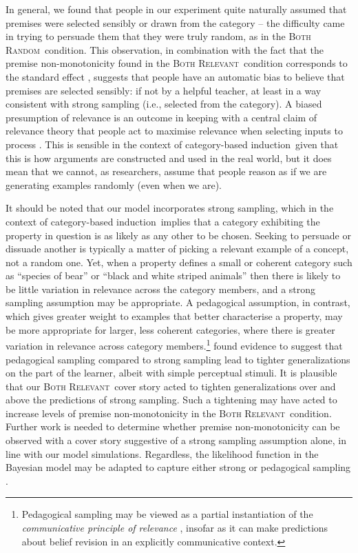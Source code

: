 \documentclass[doc,12pt]{apa}
\newcommand{\cbi}{category-based induction}
\newcommand{\relevant}{\textsc{Both Relevant}}
\newcommand{\random}{\textsc{Both Random}}
\begin{document}
%
In general, we found that people in our experiment quite naturally assumed that premises were selected sensibly or drawn from the category -- the difficulty came in trying to persuade them that they were truly random, as in the \random\ condition. This observation, in combination with the fact that the premise non-monotonicity found in the \relevant\ condition corresponds to the standard effect \cite{MCSH03}, suggests that people have an automatic bias to believe that premises are selected sensibly: if not by a helpful teacher, at least in a way consistent with strong sampling (i.e., selected from the category).
%
A biased presumption of relevance is an outcome in keeping with a central claim of relevance theory that people act to maximise relevance when selecting inputs to process \cite{WS04}. This is sensible in the context of \cbi\ given that this is how arguments are constructed and used in the real world, but it does mean that we cannot, as researchers, assume that people reason as if we are generating examples randomly (even when we are).

%
It should be noted that our model incorporates strong sampling, which in the context of \cbi\ implies that a category exhibiting the property in question is as likely as any other to be chosen.
Seeking to persuade or dissuade another is typically a matter of picking a relevant example of a concept, not a random one. Yet, when a property defines a small or coherent category such as ``species of bear'' or ``black and white striped animals'' then there is likely to be little variation in relevance across the category members, and a strong sampling assumption may be appropriate. A pedagogical assumption, in contrast, which gives greater weight to examples that better characterise a property, may be more appropriate for larger, less coherent categories, where there is greater variation in relevance across category members.\footnote{Pedagogical sampling \cite{SGG14} may be viewed as a partial instantiation of the {\em communicative principle of relevance} \cite{WS04}, insofar as it can make predictions about belief revision in an explicitly communicative context.}
%
 found evidence to suggest that pedagogical sampling compared to strong sampling lead to tighter generalizations on the part of the learner, albeit with simple perceptual stimuli. It is plausible that our \relevant\ cover story acted to tighten generalizations over and above the predictions of strong sampling. Such a tightening may have acted to increase levels of premise non-monotonicity in the \relevant\ condition. Further work is needed to determine whether premise non-monotonicity can be observed with a cover story suggestive of a strong sampling assumption alone, in line with our model simulations. Regardless, the likelihood function in the Bayesian model may be adapted to capture either strong or pedagogical sampling \cite{SGG14}.
\end{document}
